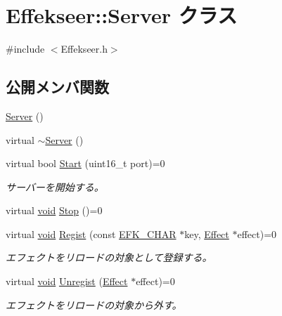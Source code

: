 \hypertarget{class_effekseer_1_1_server}{}\section{Effekseer\+:\+:Server クラス}
\label{class_effekseer_1_1_server}


{\ttfamily \#include $<$Effekseer.\+h$>$}

\subsection*{公開メンバ関数}
\begin{DoxyCompactItemize}
\item 
\mbox{\hyperlink{class_effekseer_1_1_server_af6f7a1893fb9dfe2d65a9288698e3f5a}{Server}} ()
\item 
virtual \mbox{\hyperlink{class_effekseer_1_1_server_a492364188996ee80d8baa9cba8e443d3}{$\sim$\+Server}} ()
\item 
virtual bool \mbox{\hyperlink{class_effekseer_1_1_server_afd333e58d1330710673caf909452a4c1}{Start}} (uint16\+\_\+t port)=0
\begin{DoxyCompactList}\small\item\em サーバーを開始する。 \end{DoxyCompactList}\item 
virtual \mbox{\hyperlink{namespace_effekseer_ab34c4088e512200cf4c2716f168deb56}{void}} \mbox{\hyperlink{class_effekseer_1_1_server_ac41b09333e7d792489cbeef127df89f6}{Stop}} ()=0
\item 
virtual \mbox{\hyperlink{namespace_effekseer_ab34c4088e512200cf4c2716f168deb56}{void}} \mbox{\hyperlink{class_effekseer_1_1_server_aadfbaeb38b0d1fb33ad6646430de45b0}{Regist}} (const \mbox{\hyperlink{_effekseer_8h_aca7eb5de6dd019c19ac58ea35a193f2f}{E\+F\+K\+\_\+\+C\+H\+AR}} $\ast$key, \mbox{\hyperlink{class_effekseer_1_1_effect}{Effect}} $\ast$effect)=0
\begin{DoxyCompactList}\small\item\em エフェクトをリロードの対象として登録する。 \end{DoxyCompactList}\item 
virtual \mbox{\hyperlink{namespace_effekseer_ab34c4088e512200cf4c2716f168deb56}{void}} \mbox{\hyperlink{class_effekseer_1_1_server_a81f7cfeac861a665a6d2905400735740}{Unregist}} (\mbox{\hyperlink{class_effekseer_1_1_effect}{Effect}} $\ast$effect)=0
\begin{DoxyCompactList}\small\item\em エフェクトをリロードの対象から外す。 \end{DoxyCompactList}\item 

\end{DoxyCompactItemize}
